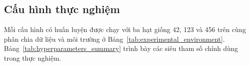 \subsection{Cấu hình thực nghiệm}
\label{sec:experimental_setup}
Mỗi cấu hình có huấn luyện được chạy với ba hạt giống 42, 123 và 456 trên cùng phân chia dữ liệu và môi trường ở Bảng~\ref{tab:experimental_environment}. Bảng~\ref{tab:hyperparameters_summary} trình bày các siêu tham số chính dùng trong thực nghiệm.

\begin{table}[H]
\centering
{}
\caption{Môi trường thực nghiệm}
\label{tab:experimental_environment}
\end{table}

